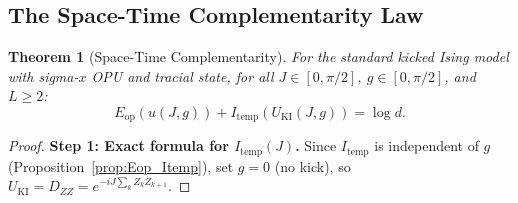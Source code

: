 \documentclass[12pt,a4paper]{article}
\newtheorem{theorem}{Theorem}[section]
\begin{document}
\subsection{The Space-Time Complementarity Law}

\begin{theorem}[Space-Time Complementarity]\label{thm:complementarity}
For the standard kicked Ising model with sigma-$x$ OPU and tracial state,
for \emph{all} $J\in[0,\pi/2]$, $g\in[0,\pi/2]$, and $L\ge 2$:
\begin{equation}\label{eq:complementarity}
  \boxed{E_\mathrm{op}(u(J,g)) + I_\mathrm{temp}(U_\mathrm{KI}(J,g)) = \log d.}
\end{equation}
\end{theorem}
\begin{proof}
\textbf{Step 1: Exact formula for $I_\mathrm{temp}(J)$.}
Since $I_\mathrm{temp}$ is independent of $g$ (Proposition~\ref{prop:Eop_Itemp}),
set $g=0$ (no kick), so $U_\mathrm{KI} = D_{ZZ} = e^{-iJ\sum_k Z_k Z_{k+1}}$.


\end{proof}
\end{document}

